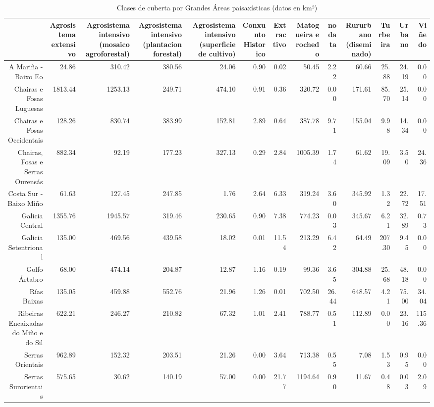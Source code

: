 \begin{table}[p]
\centering
\caption{Clases de cuberta por Grandes Áreas paisaxísticas (datos en km²)} 
\label{xtaboa2}
\begin{tabular}{rrrrrrrrrrrrr}
  \hline
 & Agrosistema extensivo & Agrosistema intensivo (mosaico agroforestal) & Agrosistema intensivo (plantacion forestal) & Agrosistema intensivo (superficie de cultivo) & Conxunto Historico & Extractivo & Matogueira e rochedo & no data & Rururbano (diseminado) & Turbeira & Urbano & Viñedo \\ 
  \hline
A Mariña - Baixo Eo & 24.86 & 310.42 & 380.56 & 24.06 & 0.90 & 0.02 & 50.45 & 2.22 & 60.66 & 25.88 & 24.19 & 0.00 \\ 
  Chairas e Fosas Luguesas & 1813.44 & 1253.13 & 249.71 & 474.10 & 0.91 & 0.36 & 320.72 & 0.00 & 171.61 & 85.70 & 25.14 & 0.00 \\ 
  Chairas e Fosas Occidentais & 128.26 & 830.74 & 383.99 & 152.81 & 2.89 & 0.64 & 387.78 & 9.71 & 155.04 & 9.98 & 14.34 & 0.00 \\ 
  Chairas, Fosas e Serras Ourensás & 882.34 & 92.19 & 177.23 & 327.13 & 0.29 & 2.84 & 1005.39 & 1.74 & 61.62 & 19.09 & 3.50 & 24.36 \\ 
  Costa Sur - Baixo Miño & 61.63 & 127.45 & 247.85 & 1.76 & 2.64 & 6.33 & 319.24 & 3.60 & 345.92 & 1.32 & 22.72 & 17.51 \\ 
  Galicia Central & 1355.76 & 1945.57 & 319.46 & 230.65 & 0.90 & 7.38 & 774.23 & 0.03 & 345.67 & 6.21 & 32.89 & 0.73 \\ 
  Galicia Setentrional & 135.00 & 469.56 & 439.58 & 18.02 & 0.01 & 11.54 & 213.29 & 6.42 & 64.49 & 207.30 & 9.45 & 0.00 \\ 
  Golfo Ártabro & 68.00 & 474.14 & 204.87 & 12.87 & 1.16 & 0.19 & 99.36 & 3.65 & 304.88 & 25.68 & 48.18 & 0.00 \\ 
  Rías Baixas & 135.05 & 459.88 & 552.76 & 21.96 & 1.26 & 0.01 & 702.50 & 26.44 & 648.57 & 4.21 & 75.00 & 34.04 \\ 
  Ribeiras Encaixadas do Miño e do Sil & 622.21 & 246.27 & 210.82 & 67.32 & 1.01 & 2.41 & 788.77 & 0.51 & 112.89 & 0.00 & 23.16 & 115.36 \\ 
  Serras Orientais & 962.89 & 152.32 & 203.51 & 21.26 & 0.00 & 3.64 & 713.38 & 0.55 & 7.08 & 1.53 & 0.95 & 0.00 \\ 
  Serras Surorientais & 575.65 & 30.62 & 140.19 & 57.00 & 0.00 & 21.77 & 1194.64 & 0.90 & 11.67 & 0.48 & 0.03 & 2.09 \\ 
   \hline
\end{tabular}
\end{table}
